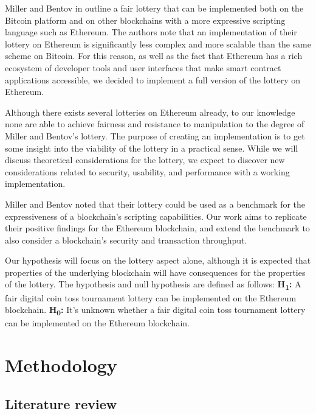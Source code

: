 Miller and Bentov in \cite{miller_zero-collateral_2017} outline a fair lottery that can be implemented both on the Bitcoin platform and on other blockchains with a more expressive scripting language such as Ethereum. The authors note that an implementation of their lottery on Ethereum is significantly less complex and more scalable than the same scheme on Bitcoin. For this reason, as well as the fact that Ethereum has a rich ecosystem of developer tools and user interfaces that make smart contract applications accessible, we decided to implement a full version of the lottery on Ethereum. 

Although there exists several lotteries on Ethereum already, to our knowledge none are able to achieve fairness and resistance to manipulation to the degree of Miller and Bentov's lottery. The purpose of creating an implementation is to get some insight into the viability of the lottery in a practical sense. While we will discuss theoretical considerations for the lottery, we expect to discover new considerations related to security, usability, and performance with a working implementation.

Miller and Bentov noted that their lottery could be used as a benchmark for the expressiveness of a blockchain's scripting capabilities. Our work aims to replicate their positive findings for the Ethereum blockchain, and extend the benchmark to also consider a blockchain's security and transaction throughput.

Our hypothesis will focus on the lottery aspect alone, although it is expected that properties of the underlying blockchain will have consequences for the properties of the lottery. The hypothesis and null hypothesis are defined as follows:
\newline
\textbf{H\textsubscript{1}:} A fair digital coin toss tournament lottery can be implemented on the Ethereum blockchain.
\newline
\textbf{H\textsubscript{0}:} It's unknown whether a fair digital coin toss tournament lottery can be implemented on the Ethereum blockchain.

\section{Methodology}
\label{sec:methodology}

\subsection{Literature review}

